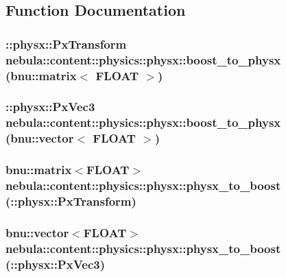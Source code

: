 \subsection{Function Documentation}
\hypertarget{namespacenebula_1_1content_1_1physics_1_1physx_a42899bfaa002c3e69981d26813d3d0a2}{
\subsubsection[{boost\_\-to\_\-physx}]{\setlength{\rightskip}{0pt plus 5cm}::physx::PxTransform nebula::content::physics::physx::boost\_\-to\_\-physx (bnu::matrix$<$ FLOAT $>$)}}
\label{namespacenebula_1_1content_1_1physics_1_1physx_a42899bfaa002c3e69981d26813d3d0a2}
\hypertarget{namespacenebula_1_1content_1_1physics_1_1physx_afc6ea9f045e8811b84467045f45adf73}{
\subsubsection[{boost\_\-to\_\-physx}]{\setlength{\rightskip}{0pt plus 5cm}::physx::PxVec3 nebula::content::physics::physx::boost\_\-to\_\-physx (bnu::vector$<$ FLOAT $>$)}}
\label{namespacenebula_1_1content_1_1physics_1_1physx_afc6ea9f045e8811b84467045f45adf73}
\hypertarget{namespacenebula_1_1content_1_1physics_1_1physx_a83251ccfbe82a792dfe564636bf3028c}{
\subsubsection[{physx\_\-to\_\-boost}]{\setlength{\rightskip}{0pt plus 5cm}bnu::matrix$<$FLOAT$>$ nebula::content::physics::physx::physx\_\-to\_\-boost (::physx::PxTransform)}}
\label{namespacenebula_1_1content_1_1physics_1_1physx_a83251ccfbe82a792dfe564636bf3028c}
\hypertarget{namespacenebula_1_1content_1_1physics_1_1physx_a421b2b028e6b960a77656f531c6e2e99}{
\subsubsection[{physx\_\-to\_\-boost}]{\setlength{\rightskip}{0pt plus 5cm}bnu::vector$<$FLOAT$>$ nebula::content::physics::physx::physx\_\-to\_\-boost (::physx::PxVec3)}}
\label{namespacenebula_1_1content_1_1physics_1_1physx_a421b2b028e6b960a77656f531c6e2e99}
